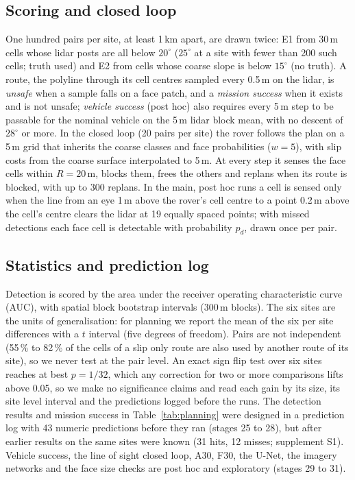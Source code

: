 \documentclass[conference]{IEEEtran}
\begin{document}
\subsection{Scoring and closed loop}
One hundred pairs per site, at least 1\,km apart, are drawn twice: E1 from 30\,m cells whose lidar posts are all below $20^\circ$ ($25^\circ$ at a site with fewer than 200 such cells; truth used) and E2 from cells whose coarse slope is below $15^\circ$ (no truth). A route, the polyline through its cell centres sampled every 0.5\,m on the lidar, is \emph{unsafe} when a sample falls on a face patch, and a \emph{mission success} when it exists and is not unsafe; \emph{vehicle success} (post hoc) also requires every 5\,m step to be passable for the nominal vehicle on the 5\,m lidar block mean, with no descent of $28^\circ$ or more. In the closed loop (20 pairs per site) the rover follows the plan on a 5\,m grid that inherits the coarse classes and face probabilities ($w=5$), with slip costs from the coarse surface interpolated to 5\,m. At every step it senses the face cells within $R=20$\,m, blocks them, frees the others and replans when its route is blocked, with up to 300 replans. In the main, post hoc runs a cell is sensed only when the line from an eye 1\,m above the rover's cell centre to a point 0.2\,m above the cell's centre clears the lidar at 19 equally spaced points; with missed detections each face cell is detectable with probability $p_d$, drawn once per pair.

\subsection{Statistics and prediction log}
Detection is scored by the area under the receiver operating characteristic curve (AUC), with spatial block bootstrap intervals (300\,m blocks). The six sites are the units of generalisation: for planning we report the mean of the six per site differences with a $t$ interval (five degrees of freedom). Pairs are not independent (55\,\% to 82\,\% of the cells of a slip only route are also used by another route of its site), so we never test at the pair level. An exact sign flip test over six sites reaches at best $p=1/32$, which any correction for two or more comparisons lifts above 0.05, so we make no significance claims and read each gain by its size, its site level interval and the predictions logged before the runs. The detection results and mission success in Table~\ref{tab:planning} were designed in a prediction log with 43 numeric predictions before they ran (stages 25 to 28), but after earlier results on the same sites were known (31 hits, 12 misses; supplement S1). Vehicle success, the line of sight closed loop, A30, F30, the U-Net, the imagery networks and the face size checks are post hoc and exploratory (stages 29 to 31).
\end{document}
